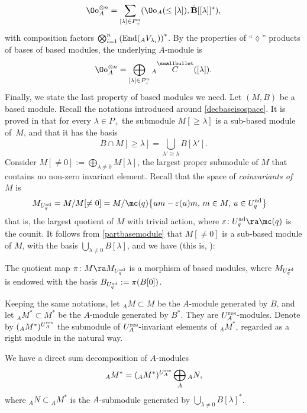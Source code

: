 \begin{equation}\label{decompositionOAcoad}
\Oo_A^{\otimes n} = \sum_{[\lambda] \in P_+^n} (\Oo_A(\leq [\lambda]), \dot{\mathbf{B}} [[\lambda]]^*),
\end{equation}
with composition factors $ \bigotimes_{i=1}^n \left({\rm End}({}_A V_{\lambda_i})\right)^*$. By the properties of ``$\lozenge$'' products of bases of based modules, the underlying $A$-module is
\begin{equation}\label{decompositionOA2}
\Oo_A^{\otimes n} = \bigoplus_{[\lambda] \in P_+^n} {}_A \overset{\raisebox{-1.5pt}{\scriptsize$\smallbullet$}}{C} ([\lambda]).
\end{equation}
Finally, we state the last property of based modules we need. Let $(M,B)$ be a based module. Recall the notations introduced around \eqref{decbaseisospace}. It is proved in \cite[Proposition 27.1.8]{Lusztig} that for every $\lambda\in P_+$ the submodule $M[\geq\lambda]$ is a sub-based module of~$M$, and that it has the basis
\begin{equation}\label{partbasemodule}
B\cap M[\geq\lambda] = \bigcup_{\lambda'\geq \lambda} B[\lambda'].
\end{equation}
Consider $M[\ne 0] := \bigoplus_{\lambda\ne 0} M[\lambda]$, the largest proper submodule of $M$ that contains no non-zero invariant element. Recall that the space of {\it coinvariants of} $M$ is
\begin{align*} M_{U_q^{\rm ad}} & = M/ M[\ne 0] = M/\mc(q)\big\{um-\varepsilon(u)m, \,m\in M, \,u\in U_q^{\rm ad}\big\}
\end{align*}
that is, the largest quotient of $M$ with trivial action, where $\varepsilon\colon U_q^{\rm ad}\ra \mc(q)$ is the counit. It follows from \eqref{partbasemodule} that $M[\ne 0]$ is a sub-based module of $M$, with the basis $\bigcup_{\lambda\ne 0} B[\lambda]$, and we have (this is, \cite[Proposition~27.2.6]{Lusztig}):
\begin{prop}\label{Linvbased} The quotient map $\pi\colon M \ra M_{U_q^{\rm ad}}$ is a morphism of based modules, where $M_{U_q^{\rm ad}}$ is endowed with the basis $B_{U_q^{\rm ad}} := \pi(B[0])$.
\end{prop}
Keeping the same notations, let ${}_AM \subset M$ be the $A$-module generated by $B$, and let ${{}_AM^* \subset M^*}$ be the $A$-module generated by $B^*$. They are $U_A^{\rm res}$-modules. Denote by $({}_A M^*)^{U_A^{\rm res}}$ the submodule of $U_A^{\rm res}$-invariant elements of ${}_A M^*$, regarded as a right module in the natural way.
\begin{lem} We have a direct sum decomposition of $A$-modules
\begin{equation}\label{decompAcoinv}
{}_A M^* = ({}_A M^*)^{U_A^{\rm res}} \bigoplus_A {}_A N,
\end{equation}
where ${}_A N\subset {}_A M^*$ is the $A$-submodule generated by $\bigcup_{\lambda\ne 0} B[\lambda]^*$.
\end{lem}

